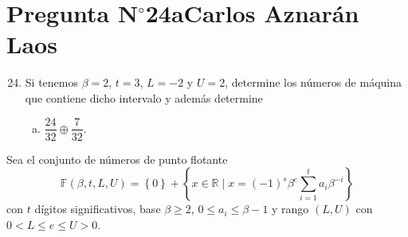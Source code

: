 \section{Pregunta N$^{\circ}$24a\qquad Carlos Aznarán Laos}

\begin{frame}
	\begin{enumerate}\setcounter{enumi}{23}
		\item

		      Si tenemos $\beta=2$, $t=3$, $L=-2$ y $U=2$, determine los
		      números de máquina que contiene dicho intervalo y además
		      determine

		      \begin{enumerate}[b)]
			      \item

			            \begin{math}
				            \dfrac{24}{32}\oplus
				            \dfrac{7}{32}
			            \end{math}.
		      \end{enumerate}
	\end{enumerate}

	\begin{solution}
		\begin{definition}
			Sea el \alert{conjunto de números de punto flotante}
			\begin{equation*}
				\mathbb{F}\left(\beta,t,L,U\right)=
				\left\{0\right\}+
				\left\{
				x\in\mathbb{R}\mid
				x=
				\left(-1\right)^{s}
				\beta^{e}
				\sum_{i=1}^{t}a_{i}\beta^{-i}
				\right\}
			\end{equation*}
			con $t$ dígitos significativos, base $\beta\geq2$,
			$0\leq a_{i}\leq\beta-1$ y rango $\left(L,U\right)$ con
			$0<L\leq e\leq U>0$.
		\end{definition}
	\end{solution}
\end{frame}

